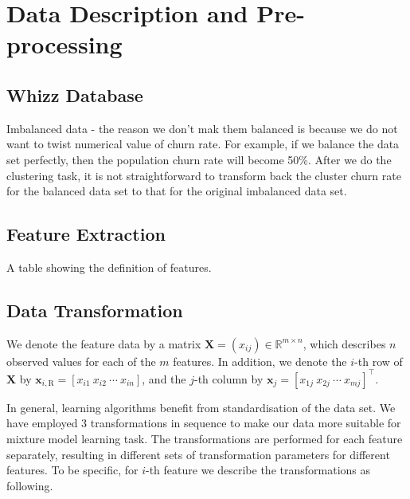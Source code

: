 \section{Data Description and Pre-processing}
\label{rec:data}

\subsection{Whizz Database}

Imbalanced data - the reason we don't mak them balanced is because we do not want to twist numerical value of churn rate. For example, if we balance the data set perfectly, then the population churn rate will become 50\%. After we do the clustering task, it is not straightforward to transform back the cluster churn rate for the balanced data set to that for the original imbalanced data set.

\subsection{Feature Extraction}

A table showing the definition of features.

\subsection{Data Transformation}

We denote the feature data by a matrix $\mathbf{X} = (x_{ij}) \in \mathbb{R}^{m \times n}$, which describes $n$ observed values for each of the $m$ features. In addition, we denote the $i$-th row of $\mathbf{X}$ by $\mathbf{x}_{i,\text{R}} = [x_{i1} ~x_{i2} ~\cdots ~x_{in}]$, and the $j$-th column by $\mathbf{x}_j = [x_{1j} ~x_{2j} ~\cdots ~x_{mj}]^\top$.


In general, learning algorithms benefit from standardisation of the data set. We have employed 3 transformations in sequence to make our data more suitable for mixture model learning task. The transformations are performed for each feature separately, resulting in different sets of transformation parameters for different features. To be specific, for $i$-th feature we describe the transformations as following.

